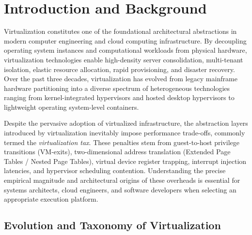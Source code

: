 \section{Introduction and Background}
\label{sec:introduction}

Virtualization constitutes one of the foundational architectural abstractions in modern computer engineering and cloud computing infrastructure. By decoupling operating system instances and computational workloads from physical hardware, virtualization technologies enable high-density server consolidation, multi-tenant isolation, elastic resource allocation, rapid provisioning, and disaster recovery. Over the past three decades, virtualization has evolved from legacy mainframe hardware partitioning into a diverse spectrum of heterogeneous technologies ranging from kernel-integrated hypervisors and hosted desktop hypervisors to lightweight operating system-level containers.

Despite the pervasive adoption of virtualized infrastructure, the abstraction layers introduced by virtualization inevitably impose performance trade-offs, commonly termed the \textit{virtualization tax}. These penalties stem from guest-to-host privilege transitions (VM-exits), two-dimensional address translation (Extended Page Tables / Nested Page Tables), virtual device register trapping, interrupt injection latencies, and hypervisor scheduling contention. Understanding the precise empirical magnitude and architectural origins of these overheads is essential for systems architects, cloud engineers, and software developers when selecting an appropriate execution platform.

\subsection{Evolution and Taxonomy of Virtualization}
\label{subsec:virtualization_taxonomy}

